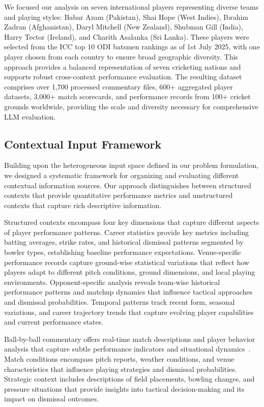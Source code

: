 \documentclass[sigconf,anonymous,review]{acmart}
\begin{document}
We focused our analysis on seven international players representing diverse teams and playing styles: Babar Azam (Pakistan), Shai Hope (West Indies), Ibrahim Zadran (Afghanistan), Daryl Mitchell (New Zealand), Shubman Gill (India), Harry Tector (Ireland), and Charith Asalanka (Sri Lanka). These players were selected from the ICC top 10 ODI batsmen rankings as of 1st July 2025, with one player chosen from each country to ensure broad geographic diversity. This approach provides a balanced representation of seven cricketing nations and supports robust cross-context performance evaluation. The resulting dataset comprises over 1,700 processed commentary files, 600+ aggregated player datasets, 3,000+ match scorecards, and performance records from 100+ cricket grounds worldwide, providing the scale and diversity necessary for comprehensive LLM evaluation.


\subsection{Contextual Input Framework}
Building upon the heterogeneous input space defined in our problem formulation, we designed a systematic framework for organizing and evaluating different contextual information sources. Our approach distinguishes between structured contexts that provide quantitative performance metrics and unstructured contexts that capture rich descriptive information.

Structured contexts encompass four key dimensions that capture different aspects of player performance patterns. Career statistics provide key metrics including batting averages, strike rates, and historical dismissal patterns segmented by bowler types, establishing baseline performance expectations. Venue-specific performance records capture ground-wise statistical variations that reflect how players adapt to different pitch conditions, ground dimensions, and local playing environments. Opponent-specific analysis reveals team-wise historical performance patterns and matchup dynamics that influence tactical approaches and dismissal probabilities. Temporal patterns track recent form, seasonal variations, and career trajectory trends that capture evolving player capabilities and current performance states.

Ball-by-ball commentary offers real-time match descriptions and player behavior analysis that capture subtle performance indicators and situational dynamics~\cite{sports_text_analytics}. Match conditions encompass pitch reports, weather conditions, and venue characteristics that influence playing strategies and dismissal probabilities. Strategic context includes descriptions of field placements, bowling changes, and pressure situations that provide insights into tactical decision-making and its impact on dismissal outcomes.
\end{document}
